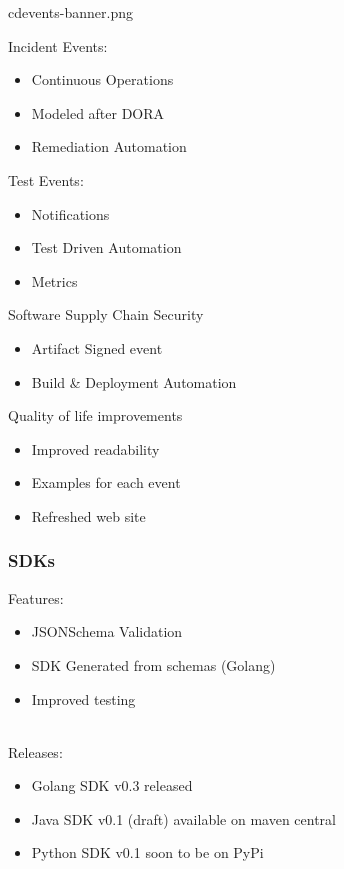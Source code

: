 \documentclass[aspectratio=169,11pt,hyperref={colorlinks=true}]{beamer}
\begin{document}
\begin{tpicstripedframe}%
  {cdevents-banner.png}
  {%
  Incident Events:
  \begin{itemize}
    \item Continuous Operations
    \item Modeled after DORA
    \item Remediation Automation
  \end{itemize}
  }%
  {%
  Test Events:
  \begin{itemize}
    \item Notifications
    \item Test Driven Automation
    \item Metrics
  \end{itemize}
  }%
  {%
  Software Supply Chain Security \\
  \vspace{0.01\textheight}
  \begin{itemize}
    \item Artifact Signed event
    \item Build \& Deployment Automation
  \end{itemize}
  }%
  {%
  Quality of life improvements
  \begin{itemize}
    \item Improved readability
    \item Examples for each event
    \item Refreshed web site
  \end{itemize}
  }%
\end{tpicstripedframe}

\begin{blackframe}
  \frametitle{SDKs}
  Features:
  \begin{itemize}
    \item JSONSchema Validation
    \item SDK Generated from schemas (Golang)
    \item Improved testing
  \end{itemize}
  ~ \\
  Releases:
  \begin{itemize}
    \item Golang SDK v0.3 released
    \item Java SDK v0.1 (draft) available on maven central
    \item Python SDK v0.1 soon to be on PyPi
  \end{itemize}
\end{blackframe}
\end{document}
